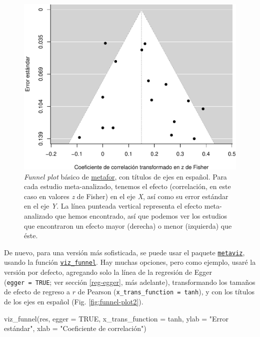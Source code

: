 \documentclass[
  bookmarksnumbered]{article}
\newenvironment{Shaded}{\begin{snugshade}}{\end{snugshade}}
\newcommand{\AttributeTok}[1]{\textcolor[rgb]{0.00,0.34,0.68}{#1}}
\newcommand{\ConstantTok}[1]{\textcolor[rgb]{0.67,0.33,0.00}{#1}}
\newcommand{\FunctionTok}[1]{\textcolor[rgb]{0.39,0.29,0.61}{#1}}
\newcommand{\NormalTok}[1]{\textcolor[rgb]{0.12,0.11,0.11}{#1}}
\newcommand{\StringTok}[1]{\textcolor[rgb]{0.75,0.01,0.01}{#1}}
\begin{document}
\begin{figure}
\centering
\includegraphics{Meta-analysis_files/figure-latex/funnel-plot1a-1.pdf}
\caption{\label{fig:funnel-plot1a}\emph{Funnel plot} básico de \href{https://www.metafor-project.org/doku.php}{metafor}, con títulos de ejes en español. Para cada estudio meta-analizado, tenemos el efecto (correlación, en este caso en valores \emph{z} de Fisher) en el eje \emph{X}, así como su error estándar en el eje \emph{Y}. La línea punteada vertical representa el efecto meta-analizado que hemos encontrado, así que podemos ver los estudios que encontraron un efecto mayor (derecha) o menor (izquierda) que éste.}
\end{figure}

De nuevo, para una versión más sofisticada, se puede usar el paquete \href{https://cran.r-project.org/web/packages/metaviz/vignettes/metaviz.html}{\texttt{metaviz}}, usando la función \href{https://cran.r-project.org/web/packages/metaviz/vignettes/metaviz.html\#creating-funnel-plots-with-viz_funnel}{\texttt{viz\_funnel}}. Hay muchas opciones, pero como ejemplo, usaré la versión por defecto, agregando solo la línea de la regresión de Egger (\texttt{egger\ =\ TRUE}; ver sección \ref{reg-egger}, más adelante), transformando los tamaños de efecto de regreso a \(r\) de Pearson (\texttt{x\_trans\_function\ =\ tanh}), y con los títulos de los ejes en español (Fig. \ref{fig:funnel-plot2}).

\begin{Shaded}
\begin{Highlighting}[]
\FunctionTok{viz\_funnel}\NormalTok{(res, }
           \AttributeTok{egger =} \ConstantTok{TRUE}\NormalTok{,}
           \AttributeTok{x\_trans\_function =}\NormalTok{ tanh,}
           \AttributeTok{ylab =} \StringTok{"Error estándar"}\NormalTok{,}
           \AttributeTok{xlab =} \StringTok{"Coeficiente de correlación"}\NormalTok{)}
\end{Highlighting}
\end{Shaded}
\end{document}
